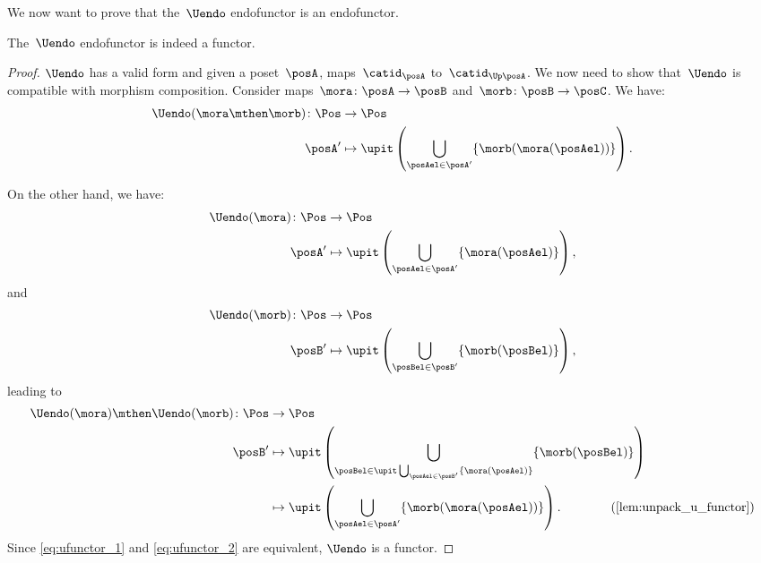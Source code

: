 We now want to prove that the~$\Uendo$ endofunctor is an endofunctor.

\begin{lemma}
  \label{lem:Uendo-is-functor}
  The~$\Uendo$ endofunctor is indeed a functor.
\end{lemma}

\begin{proof}
  $\Uendo$ has a valid form and given a poset~$\posA$, maps~$\catid_\posA$ to~$\catid_{\Up \posA}$.
  We now need to show that~$\Uendo$ is compatible with morphism composition. Consider maps~$\mora\colon \posA \to \posB$ and~$\morb\colon \posB \to \posC$. We have:
  \begin{equation}
    \label{eq:ufunctor_1}
    \begin{aligned}
      \Uendo(\mora\mthen \morb)\colon \Pos &\to \Pos\\
      \posA'&\mapsto \upit \left( \bigcup_{\posAel\in \posA'} \{\morb(\mora(\posAel))\}\right).
    \end{aligned}
  \end{equation}

  On the other hand, we have:
  \begin{equation}
    \begin{aligned}
      \Uendo(\mora)\colon \Pos &\to \Pos\\
      \posA'&\mapsto \upit \left( \bigcup_{\posAel\in \posA'}\{\mora(\posAel)\}\right),
    \end{aligned}
  \end{equation}
  and
  \begin{equation}
    \begin{aligned}
      \Uendo(\morb)\colon \Pos &\to \Pos\\
      \posB'&\mapsto \upit \left( \bigcup_{\posBel\in \posB'}\{\morb(\posBel)\}\right),
    \end{aligned}
  \end{equation}
  leading to
  \begin{equation}
    \label{eq:ufunctor_2}
    \begin{aligned}
      \Uendo(\mora)\mthen \Uendo(\morb)\colon \Pos &\to \Pos\\
      \posB'&\mapsto \upit\left( \bigcup_{\posBel\in \upit \bigcup_{\posAel\in \posB'}\{\mora(\posAel)\}}\{\morb(\posBel)\}\right)\\
      &\mapsto \upit \left(\bigcup_{\posAel\in \posA'} \{ \morb(\mora(\posAel))\}\right). \qquad \qquad (\cref{lem:unpack_u_functor})
    \end{aligned}
  \end{equation}
  Since \cref{eq:ufunctor_1} and \cref{eq:ufunctor_2} are equivalent, $\Uendo$ is a functor.
\end{proof}
